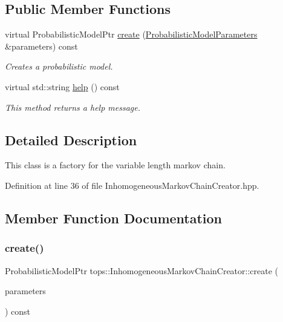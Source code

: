 \subsection*{Public Member Functions}
\begin{DoxyCompactItemize}
\item 
virtual Probabilistic\+Model\+Ptr \hyperlink{classtops_1_1InhomogeneousMarkovChainCreator_ac31f56513eef40d55c7e09dcfa5a80c8}{create} (\hyperlink{classtops_1_1ProbabilisticModelParameters}{Probabilistic\+Model\+Parameters} \&parameters) const
\begin{DoxyCompactList}\small\item\em Creates a probabilistic model. \end{DoxyCompactList}\item 
\mbox{\label{classtops_1_1InhomogeneousMarkovChainCreator_a39fee4292cf30c58825df39e431fd121}} 
virtual std\+::string \hyperlink{classtops_1_1InhomogeneousMarkovChainCreator_a39fee4292cf30c58825df39e431fd121}{help} () const
\begin{DoxyCompactList}\small\item\em This method returns a help message. \end{DoxyCompactList}\end{DoxyCompactItemize}


\subsection{Detailed Description}
This class is a factory for the variable length markov chain. 

Definition at line 36 of file Inhomogeneous\+Markov\+Chain\+Creator.\+hpp.



\subsection{Member Function Documentation}
\mbox{\label{classtops_1_1InhomogeneousMarkovChainCreator_ac31f56513eef40d55c7e09dcfa5a80c8}} 
\subsubsection{\texorpdfstring{create()}{create()}}
{\footnotesize\ttfamily Probabilistic\+Model\+Ptr tops\+::\+Inhomogeneous\+Markov\+Chain\+Creator\+::create (\begin{DoxyParamCaption}\item[{\hyperlink{classtops_1_1ProbabilisticModelParameters}{Probabilistic\+Model\+Parameters} \&}]{parameters }\end{DoxyParamCaption}) const\hspace{0.3cm}{\ttfamily [virtual]}}



